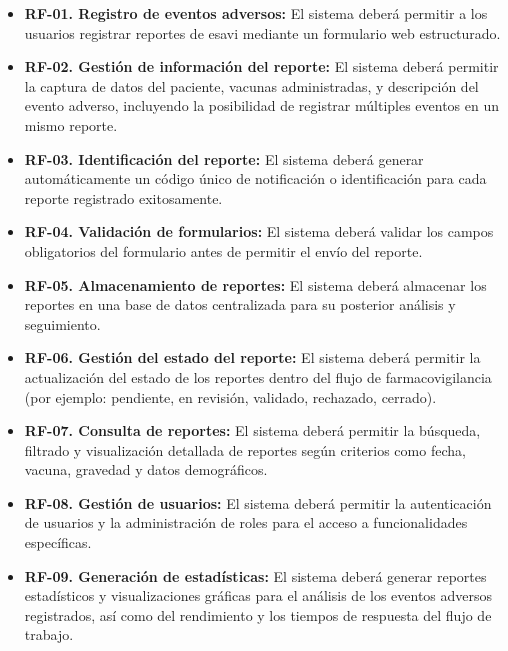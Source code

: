 \begin{itemize}

\item \textbf{RF-01. Registro de eventos adversos:}  
El sistema deberá permitir a los usuarios registrar reportes de \gls{esavi} mediante un formulario web estructurado.

\item \textbf{RF-02. Gestión de información del reporte:}  
El sistema deberá permitir la captura de datos del paciente, vacunas administradas, y descripción del evento adverso, incluyendo la posibilidad de registrar múltiples eventos en un mismo reporte.

\item \textbf{RF-03. Identificación del reporte:}  
El sistema deberá generar automáticamente un código único de notificación o identificación para cada reporte registrado exitosamente.

\item \textbf{RF-04. Validación de formularios:}  
El sistema deberá validar los campos obligatorios del formulario antes de permitir el envío del reporte.

\item \textbf{RF-05. Almacenamiento de reportes:}  
El sistema deberá almacenar los reportes en una base de datos centralizada para su posterior análisis y seguimiento.

\item \textbf{RF-06. Gestión del estado del reporte:}  
El sistema deberá permitir la actualización del estado de los reportes dentro del flujo de farmacovigilancia (por ejemplo: pendiente, en revisión, validado, rechazado, cerrado).

\item \textbf{RF-07. Consulta de reportes:}  
El sistema deberá permitir la búsqueda, filtrado y visualización detallada de reportes según criterios como fecha, vacuna, gravedad y datos demográficos.


\item \textbf{RF-08. Gestión de usuarios:}  
El sistema deberá permitir la autenticación de usuarios y la administración de roles para el acceso a funcionalidades específicas.

\item \textbf{RF-09. Generación de estadísticas:}  
El sistema deberá generar reportes estadísticos y visualizaciones gráficas para el análisis de los eventos adversos registrados, así como del rendimiento y los tiempos de respuesta del flujo de trabajo.


\end{itemize}
